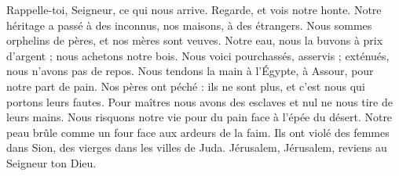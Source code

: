 Rappelle-toi, Seigneur, ce qui nous arrive. Regarde, et vois notre honte.
Notre héritage a passé à des inconnus, nos maisons, à des étrangers.
Nous sommes orphelins de pères, et nos mères sont veuves.
Notre eau, nous la buvons à prix d’argent ; nous achetons notre bois.
Nous voici pourchassés, asservis ; exténués, nous n’avons pas de repos.
Nous tendons la main à l’Égypte, à Assour, pour notre part de pain.
Nos pères ont péché : ils ne sont plus, et c’est nous qui portons leurs fautes.
Pour maîtres nous avons des esclaves et nul ne nous tire de leurs mains.
Nous risquons notre vie pour du pain face à l’épée du désert.
Notre peau brûle comme un four face aux ardeurs de la faim.
Ils ont violé des femmes dans Sion, des vierges dans les villes de Juda.
Jérusalem, Jérusalem, reviens au Seigneur ton Dieu.
